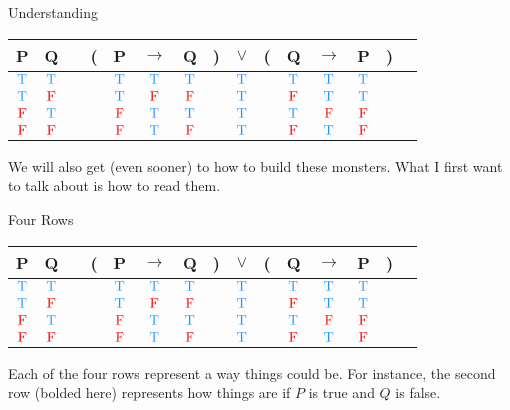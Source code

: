 \documentclass[
  ignorenonframetext,
]{beamer}
\renewcommand{\,}{\text{, }}
\def\True{\textcolor{dodgerblue}{\text{T}}}
\def\False{\textcolor{red}{\text{F}}}
\begin{document}
\begin{frame}{Understanding}
\protect\hypertarget{understanding}{}

\begin{center}
\begin{tabular}{@{ }c@{ }@{ }c | c@{ }@{}c@{}@{ }c@{ }@{ }c@{ }@{ }c@{ }@{}c@{}@{ }c@{ }@{}c@{}@{ }c@{ }@{ }c@{ }@{ }c@{ }@{}c@{}@{ }c}
P & Q &  & ( & P & $\rightarrow$ & Q & ) & $\lor$ & ( & Q & $\rightarrow$ & P & ) & \\
\hline 
$\True$ & $\True$ &  &  & $\True$ & $\True$ & $\True$ &  & \textcolor{red}{$\True$} &  & $\True$ & $\True$ & $\True$ &  & \\
$\True$ & $\False$ &  &  & $\True$ & $\False$ & $\False$ &  & \textcolor{red}{$\True$} &  & $\False$ & $\True$ & $\True$ &  & \\
$\False$ & $\True$ &  &  & $\False$ & $\True$ & $\True$ &  & \textcolor{red}{$\True$} &  & $\True$ & $\False$ & $\False$ &  & \\
$\False$ & $\False$ &  &  & $\False$ & $\True$ & $\False$ &  & \textcolor{red}{$\True$} &  & $\False$ & $\True$ & $\False$ &  & \\
\end{tabular}
\bigskip
\end{center}

We will also get (even sooner) to how to build these monsters. What I
first want to talk about is how to read them.

\end{frame}

\begin{frame}{Four Rows}
\protect\hypertarget{four-rows}{}

\begin{center}
\begin{tabular}{@{ }c@{ }@{ }c | c@{ }@{}c@{}@{ }c@{ }@{ }c@{ }@{ }c@{ }@{}c@{}@{ }c@{ }@{}c@{}@{ }c@{ }@{ }c@{ }@{ }c@{ }@{}c@{}@{ }c}
P & Q &  & ( & P & $\rightarrow$ & Q & ) & $\lor$ & ( & Q & $\rightarrow$ & P & ) & \\
\hline 
$\True$ & $\True$ &  &  & $\True$ & $\True$ & $\True$ &  & \textcolor{red}{$\True$} &  & $\True$ & $\True$ & $\True$ &  & \\
\textbf{$\True$} & \textbf{$\False$} &  &  & \textbf{$\True$} & \textbf{$\False$} & \textbf{$\False$} &  & \textcolor{red}{\textbf{$\True$}} &  & \textbf{$\False$} & \textbf{$\True$} & \textbf{$\True$} &  & \\
$\False$ & $\True$ &  &  & $\False$ & $\True$ & $\True$ &  & \textcolor{red}{$\True$} &  & $\True$ & $\False$ & $\False$ &  & \\
$\False$ & $\False$ &  &  & $\False$ & $\True$ & $\False$ &  & \textcolor{red}{$\True$} &  & $\False$ & $\True$ & $\False$ &  & \\
\end{tabular}
\bigskip
\end{center}

Each of the four rows represent a way things could be. For instance, the
second row (bolded here) represents how things are if \(P\) is true and
\(Q\) is false.

\end{frame}
\end{document}

